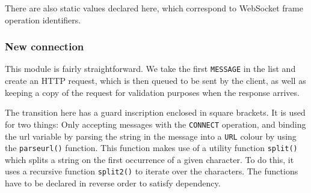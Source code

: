 	There are also static values declared here, which correspond to WebSocket
	frame operation identifiers.
	
	\subsubsection{New connection}
		
		
		This module is fairly straightforward. We take the first \lstinline:MESSAGE:
		in the list and create an HTTP request, which is then queued to be sent by the
		client, as well as keeping a copy of the request for validation purposes when
		the response arrives.
		
		The transition here has a guard inscription enclosed in square brackets. It is
		used for two things:
		Only accepting messages with the \lstinline:CONNECT: operation, and binding the
		url variable by parsing the string in the message into a \lstinline:URL:
		colour by using the \lstinline:parseurl(): function. This function makes use of
		a utility function \lstinline:split():  which splits a string on the first
		occurrence of a given character. To do this, it uses a recursive function
		\lstinline:split2(): to iterate over the characters. The functions have to be
		declared in reverse order to satisfy dependency.
		
		
		
